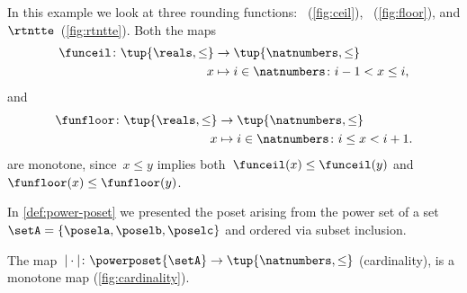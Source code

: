 \begin{figure}[h!]
\end{figure}

\begin{example}
	\label{ex:rounding-functions}
	In this example we look at three rounding functions: \funceil~(\cref{fig:ceil}), \funfloor~(\cref{fig:floor}), and $\rtntte$~(\cref{fig:rtntte}).
	Both the maps
	\begin{equation*}
		\begin{aligned}
			\funceil\colon \tup{\reals,\leq} & \to \tup{\natnumbers,\leq}                    \\
			x                                & \mapsto i \in \natnumbers \colon i-1<x\leq i,
		\end{aligned}
	\end{equation*}
	and
	\begin{equation*}
		\begin{aligned}
			\funfloor\colon \tup{\reals,\leq} & \to \tup{\natnumbers,\leq}                     \\
			x                                 & \mapsto i \in \natnumbers \colon i\leq x< i+1.
		\end{aligned}
	\end{equation*}
	are monotone, since~$x\leq y$ implies both~$\funceil(x)\leq \funceil(y)$ and~$\funfloor(x)\leq\funfloor(y)$.
	\begin{figure*}[h!]
		\centering
		\hfill
		\hfill
	\end{figure*}
\end{example}

\begin{example}
	In \cref{def:power-poset} we presented the poset arising from the power set of a set~$\setA=\{\posela,\poselb,\poselc\}$ and ordered via subset inclusion.

	The map~$\vert \cdot \vert \colon \powerposet{\setA} \to \tup{\natnumbers,\leq}$ (cardinality), is a monotone map (\cref{fig:cardinality}).
	\begin{figure*}[h!]
		\centering
		\caption{The cardinality map is a monotone map. }
		\label{fig:cardinality}
	\end{figure*}
\end{example}


